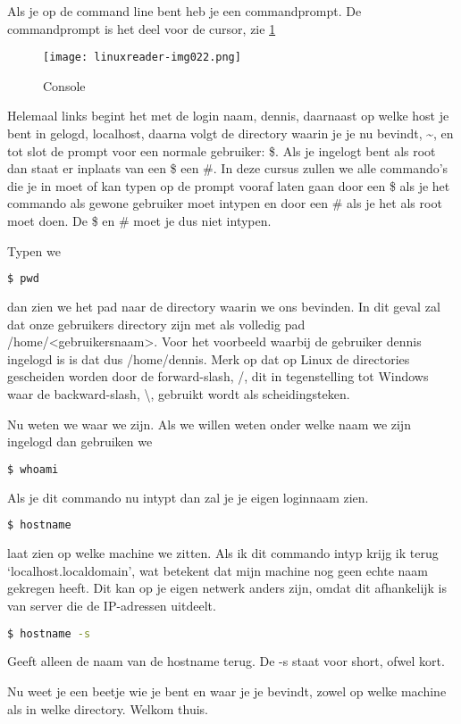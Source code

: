 Als je op de command line bent heb je een commandprompt. De commandprompt is het deel voor de cursor, zie \ref{fig:console}

\begin{figure}[h]
\texttt{[image: linuxreader-img022.png]}
	\caption{Console}
	\label{fig:console}
\end{figure}

Helemaal links begint het met de login naam, dennis, daarnaast op welke host je bent in gelogd, localhost, daarna volgt de directory
waarin je je nu bevindt, \~{}, en tot slot de prompt voor een normale gebruiker: \$. Als je ingelogt bent als root dan staat er inplaats van een \$ een \#. In deze cursus zullen we alle commando's die je in moet of kan typen op de prompt vooraf laten gaan door een \$ als je het commando als gewone gebruiker moet intypen en door een \# als je het als root moet doen. De \$ en \# moet je dus niet intypen.

Typen we
\begin{lstlisting}[language=bash]
$ pwd
\end{lstlisting}
dan zien we het pad naar de directory waarin we ons bevinden. In dit geval zal dat onze gebruikers
directory zijn met als volledig pad /home/{\textless}gebruikersnaam{\textgreater}. Voor het voorbeeld waarbij de
gebruiker dennis ingelogd is is dat dus /home/dennis. Merk op dat op Linux de directories gescheiden worden door de
forward-slash, /, dit in tegenstelling tot Windows waar de backward-slash, {\textbackslash}, gebruikt wordt als
scheidingsteken.

Nu weten we waar we zijn. Als we willen weten onder welke naam we zijn ingelogd dan gebruiken we
\begin{lstlisting}[language=bash]
$ whoami
\end{lstlisting}
Als je dit commando nu intypt dan zal je je eigen loginnaam zien.

\begin{lstlisting}[language=bash]
$ hostname
\end{lstlisting}
laat zien op welke machine we zitten. Als ik dit commando intyp krijg ik terug `localhost.localdomain', wat
betekent dat mijn machine nog geen echte naam gekregen heeft. Dit kan op je eigen netwerk anders zijn, omdat dit
afhankelijk is van server die de IP-adressen uitdeelt.

\begin{lstlisting}[language=bash]
$ hostname -s
\end{lstlisting}
Geeft alleen de naam van de hostname terug. De -s staat voor short, ofwel kort.

Nu weet je een beetje wie je bent en waar je je bevindt, zowel op welke machine als in welke directory. Welkom thuis.

